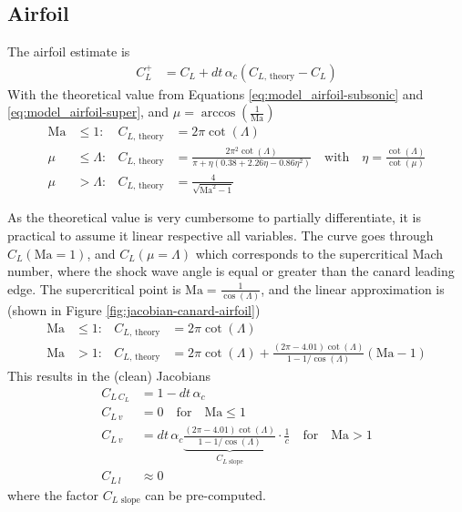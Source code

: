 \subsection{Airfoil}
The airfoil estimate  is
\begin{align}
    C_L^+ &= C_L + dt \, \alpha_c (C_{L\text{, theory}} - C_L) \label{eq:jacobian-cl-update}
\end{align}
With the theoretical value from Equations \ref{eq:model_airfoil-subsonic} and \ref{eq:model_airfoil-super}, and $\mu = \arccos(\frac{1}{\mathrm{Ma}})$
\begin{align}
    \mathrm{Ma} &\leq  1: & C_{L\text{, theory}} &= 2 \pi\cot(\Lambda)
    \\
    \mu &\leq \Lambda : & C_{L\text{, theory}} &= \frac{2 \pi^2 \cot(\Lambda)}{\pi + \eta (0.38 + 2.26 \eta - 0.86 \eta^2)} \quad \text{with} \quad \eta = \frac{\cot(\Lambda)}{\cot(\mu)} 
    \\
    \mu &> \Lambda : &C_{L\text{, theory}} &= \frac{4}{\sqrt{\mathrm{Ma}^2-1}}
\end{align}

As the theoretical value is very cumbersome to partially differentiate, it is practical to assume it linear respective all variables. 
The curve goes through $C_L(\mathrm{Ma}=1)$, and $C_L(\mu = \Lambda)$ which corresponds to the supercritical Mach number, where the shock wave angle is equal or greater than the canard leading edge.
The supercritical point is $\mathrm{Ma} = \frac{1}{\cos(\Lambda)}$, and the linear approximation is (shown in Figure \ref{fig:jacobian-canard-airfoil})
\begin{align}
    \mathrm{Ma} &\leq  1: & C_{L\text{, theory}} &= 2 \pi\cot(\Lambda)
    \\
    \mathrm{Ma} &>  1: & C_{L\text{, theory}} &= 2 \pi\cot(\Lambda) + \frac{(2 \pi - 4.01) \cot(\Lambda)}{1 - 1/\cos(\Lambda)} (\mathrm{Ma}-1)
\end{align}
This results in the (clean) Jacobians
\begin{align}
    C_{L \, C_L} &= 1 - dt \, \alpha_c
    \\
    C_{L \, v} &= 0 \quad\text{for}\quad \mathrm{Ma}\leq 1
    \\
    C_{L \, v} &=  dt \, \alpha_c  
    \underbrace{\frac{(2 \pi - 4.01) \cot(\Lambda)}{1 - 1/\cos(\Lambda)}}_{C_{L \text{ slope}}} \cdot \frac{1}{c}
    \quad\text{for}\quad \mathrm{Ma}> 1
    \\
    C_{L \, l} &\approx 0
\end{align}
where the factor $C_{L \text{ slope}}$ can be pre-computed.

